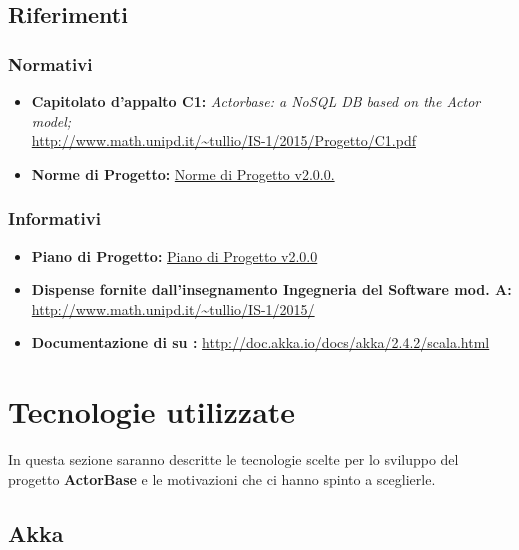 \documentclass{scalatekids-article}
\begin{document}
\prodPurpose

\glossExpl

\subsection{Riferimenti}

\subsubsection{Normativi}

\begin{itemize}

\item\textbf{Capitolato d'appalto C1:} \textit{Actorbase: a
    NoSQL DB based on the Actor model;}\\
  \url{http://www.math.unipd.it/~tullio/IS-1/2015/Progetto/C1.pdf}
\item\textbf{Norme di Progetto:}
  \href{run:../Interni/NormeDiProgetto\_v2.0.0.pdf}{Norme di Progetto v2.0.0.}
\end{itemize}

\subsubsection{Informativi}

\begin{itemize}
\item\textbf{Piano di Progetto:}
  \href{run:./PianoDiProgetto\_v2.0.0.pdf}{Piano di Progetto v2.0.0}
\item\textbf{Dispense fornite dall'insegnamento Ingegneria del Software mod.
    A:}\\   \url{http://www.math.unipd.it/~tullio/IS-1/2015/}
\item\textbf{Documentazione di  su :}
  \url{http://doc.akka.io/docs/akka/2.4.2/scala.html}
\end{itemize}

\newpage

\section{Tecnologie utilizzate}

In questa sezione saranno descritte le tecnologie scelte per lo sviluppo del
progetto \textbf{ActorBase} e le motivazioni che ci hanno spinto a sceglierle.

\subsection{Akka}
\end{document}
